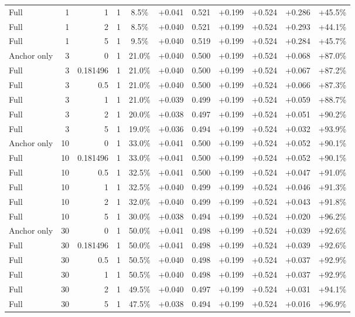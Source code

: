 \begin{table}[htbp]
\begin{tabular}{lrrrccccccc}
Full & 1 & 1 & 1 & 8.5\% & +0.041 & 0.521 & +0.199 & +0.524 & +0.286 & +45.5\% \\
Full & 1 & 2 & 1 & 8.5\% & +0.040 & 0.521 & +0.199 & +0.524 & +0.293 & +44.1\% \\
Full & 1 & 5 & 1 & 9.5\% & +0.040 & 0.519 & +0.199 & +0.524 & +0.284 & +45.7\% \\
Anchor only & 3 & 0 & 1 & 21.0\% & +0.040 & 0.500 & +0.199 & +0.524 & +0.068 & +87.0\% \\
Full & 3 & 0.181496 & 1 & 21.0\% & +0.040 & 0.500 & +0.199 & +0.524 & +0.067 & +87.2\% \\
Full & 3 & 0.5 & 1 & 21.0\% & +0.040 & 0.500 & +0.199 & +0.524 & +0.066 & +87.3\% \\
Full & 3 & 1 & 1 & 21.0\% & +0.039 & 0.499 & +0.199 & +0.524 & +0.059 & +88.7\% \\
Full & 3 & 2 & 1 & 20.0\% & +0.038 & 0.497 & +0.199 & +0.524 & +0.051 & +90.2\% \\
Full & 3 & 5 & 1 & 19.0\% & +0.036 & 0.494 & +0.199 & +0.524 & +0.032 & +93.9\% \\
Anchor only & 10 & 0 & 1 & 33.0\% & +0.041 & 0.500 & +0.199 & +0.524 & +0.052 & +90.1\% \\
Full & 10 & 0.181496 & 1 & 33.0\% & +0.041 & 0.500 & +0.199 & +0.524 & +0.052 & +90.1\% \\
Full & 10 & 0.5 & 1 & 32.5\% & +0.041 & 0.500 & +0.199 & +0.524 & +0.047 & +91.0\% \\
Full & 10 & 1 & 1 & 32.5\% & +0.040 & 0.499 & +0.199 & +0.524 & +0.046 & +91.3\% \\
Full & 10 & 2 & 1 & 32.0\% & +0.040 & 0.499 & +0.199 & +0.524 & +0.043 & +91.8\% \\
Full & 10 & 5 & 1 & 30.0\% & +0.038 & 0.494 & +0.199 & +0.524 & +0.020 & +96.2\% \\
Anchor only & 30 & 0 & 1 & 50.0\% & +0.041 & 0.498 & +0.199 & +0.524 & +0.039 & +92.6\% \\
Full & 30 & 0.181496 & 1 & 50.0\% & +0.041 & 0.498 & +0.199 & +0.524 & +0.039 & +92.6\% \\
Full & 30 & 0.5 & 1 & 50.5\% & +0.040 & 0.498 & +0.199 & +0.524 & +0.037 & +92.9\% \\
Full & 30 & 1 & 1 & 50.5\% & +0.040 & 0.498 & +0.199 & +0.524 & +0.037 & +92.9\% \\
Full & 30 & 2 & 1 & 49.5\% & +0.040 & 0.497 & +0.199 & +0.524 & +0.031 & +94.1\% \\
Full & 30 & 5 & 1 & 47.5\% & +0.038 & 0.494 & +0.199 & +0.524 & +0.016 & +96.9\% \\

\end{tabular}
\end{table}
